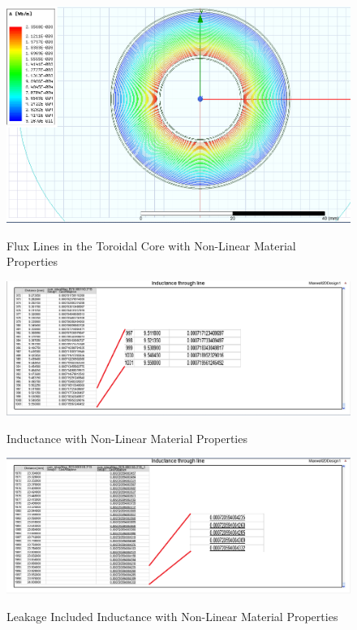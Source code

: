\begin{enumerate}
\begin{figure}[H]
\hspace{1.5cm}
\centering\includegraphics[width=4.5in]{flux_line_nonlinear.PNG}\\
\caption{Flux Lines in the Toroidal Core with Non-Linear Material Properties}
\label{flux2}
\end{figure} 

\begin{figure}[H]
\hspace{1.5cm}
\centering\includegraphics[width=4.5in]{nonlinear_inductance.PNG}\\
\caption{Inductance with Non-Linear Material Properties}
\label{ind2}
\end{figure}

\begin{figure}[H]
\hspace{1.5cm}
\centering\includegraphics[width=4.5in]{leakage.PNG}\\
\caption{Leakage Included Inductance with Non-Linear Material Properties}
\label{leak1}
\end{figure} 



\end{enumerate}
